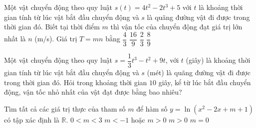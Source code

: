 \begin{ex}%
	Một vật chuyển động theo quy luật $s(t)=4t^{2}-2t^{3}+5$ với $t$  là khoảng thời gian tính từ lúc vật bắt đầu chuyển động và $s$ là quãng đường vật đi được trong thời gian đó. Biết tại thời điểm $m$ thì vận tốc của chuyển động đạt giá trị lớn nhất là $n$ (m/s). Giá trị $T = mn$ bằng
	\choice 
		 {$\dfrac{4}{3}$}
		{\True  $\dfrac{16}{9}$}
		 {$\dfrac{2}{3}$}
		{$\dfrac{8}{9}$} 
\end{ex}

\begin{ex}%
	Một vật chuyển động theo quy luật $s=\dfrac{1}{3}t^3-t^2+9 t$, với $t$ (giây) là khoảng thời gian tính từ lúc vật bắt  đầu chuyển động và $s$ (mét) là quãng đường vật đi được trong thời gian đó. Hỏi trong khoảng thời gian $10$ giây, kể từ lúc bắt đầu chuyển động, vận tốc nhỏ nhất của vật đạt được bằng bao nhiêu?\\
\end{ex}

\begin{ex}%
	Tìm tất cả các giá trị thực của tham số $m$ để hàm số $y=\ln \left(x^2-2x+m+1\right)$ có tập xác  định là $\mathbb{R}$.
	 \choice
		{$0< m <  3$}
		{$m  <-1$ hoặc $m > 0$}
		 {\True $m > 0$}
		 {$m=0$}
\end{ex}


